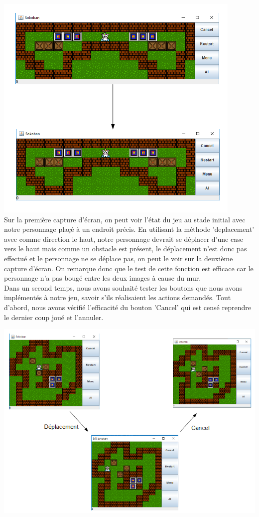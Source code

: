 \documentclass[a4paper,12pt]{article} %
\begin{document}
\includegraphics[scale=1.3]{Test2.PNG}\\

Sur la première capture d'écran, on peut voir l'état du jeu au stade initial avec notre personnage plaçé à un endroit précis. En utilisant la méthode 'deplacement' avec comme direction le haut, notre personnage devrait se déplacer d'une case vers le haut mais comme un obstacle est présent, le déplacement n'est donc pas effectué et le personnage ne se déplace pas, on peut le voir sur la deuxième capture d'écran. On remarque donc que le test de cette fonction est efficace car le personnage n'a pas bougé entre les deux images à cause du mur.\\

Dans un second temps, nous avons souhaité tester les boutons que nous avons implémentés à notre jeu, savoir s'ils réalisaient les actions demandés. Tout d'abord, nous avons vérifié l'efficacité du bouton 'Cancel' qui est censé reprendre le dernier coup joué et l'annuler.

\includegraphics[scale=0.9]{Test3.PNG}\\
\end{document}
